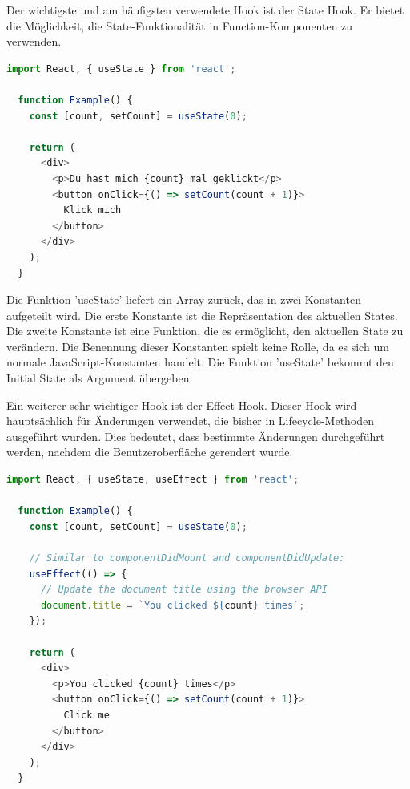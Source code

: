 Der wichtigste und am häufigsten verwendete Hook ist der State Hook. Er bietet die Möglichkeit, die State-Funktionalität in Function-Komponenten zu verwenden.

\cite{hooks}

\newpage

\begin{lstlisting}[language=JavaScript, caption=Code-Beispiel für Nutzung des State Hooks, label=lst:impl:stateHook]
  import React, { useState } from 'react';

  function Example() {
    const [count, setCount] = useState(0);

    return (
      <div>
        <p>Du hast mich {count} mal geklickt</p>
        <button onClick={() => setCount(count + 1)}>
          Klick mich
        </button>
      </div>
    );
  }
\end{lstlisting} \cite{hooks}

Die Funktion 'useState' liefert ein Array zurück, das in zwei Konstanten aufgeteilt wird. Die erste Konstante ist die Repräsentation des aktuellen States. Die zweite Konstante ist eine Funktion, die es ermöglicht, den aktuellen State zu verändern. Die Benennung dieser Konstanten spielt keine Rolle, da es sich um normale JavaScript-Konstanten handelt. Die Funktion 'useState' bekommt den Initial State als Argument übergeben.

Ein weiterer sehr wichtiger Hook ist der Effect Hook. Dieser Hook wird hauptsächlich für Änderungen verwendet, die bisher in Lifecycle-Methoden ausgeführt wurden. Dies bedeutet, dass bestimmte Änderungen durchgeführt werden, nachdem die Benutzeroberfläche gerendert wurde.
\cite{hooks} \\

\begin{lstlisting}[language=JavaScript, caption=Code-Beispiel für Nutzung des Effect Hooks, label=lst:impl:effectHook]
  import React, { useState, useEffect } from 'react';

  function Example() {
    const [count, setCount] = useState(0);
  
    // Similar to componentDidMount and componentDidUpdate:
    useEffect(() => {
      // Update the document title using the browser API
      document.title = `You clicked ${count} times`;
    });
  
    return (
      <div>
        <p>You clicked {count} times</p>
        <button onClick={() => setCount(count + 1)}>
          Click me
        </button>
      </div>
    );
  }
\end{lstlisting} \cite{hooks2}

